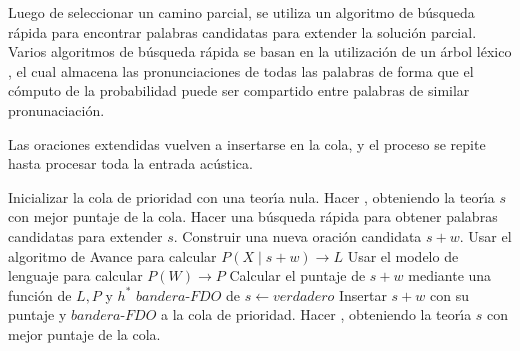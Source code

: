 Luego de seleccionar un camino parcial, se utiliza un algoritmo de b\'usqueda r\'apida para encontrar palabras candidatas para extender
 la soluci\'on parcial. Varios algoritmos de b\'usqueda \cite{GuptaFast1988, BahlSpeech1993} r\'apida se basan en la utilizaci\'on de un 
 \'arbol l\'exico \cite{KlovstadCasper1975}, el cual almacena las pronunciaciones de todas las palabras de forma que el c\'omputo de la 
 probabilidad puede ser compartido entre palabras de similar pronunaciaci\'on.

Las oraciones extendidas vuelven a insertarse en la cola, y el proceso se repite hasta procesar toda la entrada ac\'ustica.

\begin{algorithm}[H]
	\caption{Algoritmo A*} \label{stack}
\begin{algorithmic}[1]
	\STATE Inicializar la cola de prioridad con una teor{\'\i}a nula.
	\STATE Hacer , obteniendo la teor{\'\i}a $s$ con mejor puntaje de la cola.
		\STATE Hacer una b\'usqueda r\'apida para obtener palabras candidatas para extender $s$.
			\STATE Construir una nueva oraci\'on candidata $s + w$.
			\STATE Usar el algoritmo de Avance para calcular $P(X \mid s + w) \rightarrow L$
			\STATE Usar el modelo de lenguaje para calcular $P(W) \rightarrow P$
			\STATE Calcular el puntaje de $s + w$ mediante una funci\'on de $L, P$ y $h^*$
				\STATE $bandera\mbox{-}FDO$ de $s \leftarrow verdadero$
			\ENDIF
			\STATE Insertar $s + w$ con su puntaje y $bandera\mbox{-}FDO$ a la cola de prioridad.
			\STATE Hacer , obteniendo la teor{\'\i}a $s$ con mejor puntaje de la cola.
		\ENDFOR
	\ENDWHILE
\end{algorithmic}
\end{algorithm}